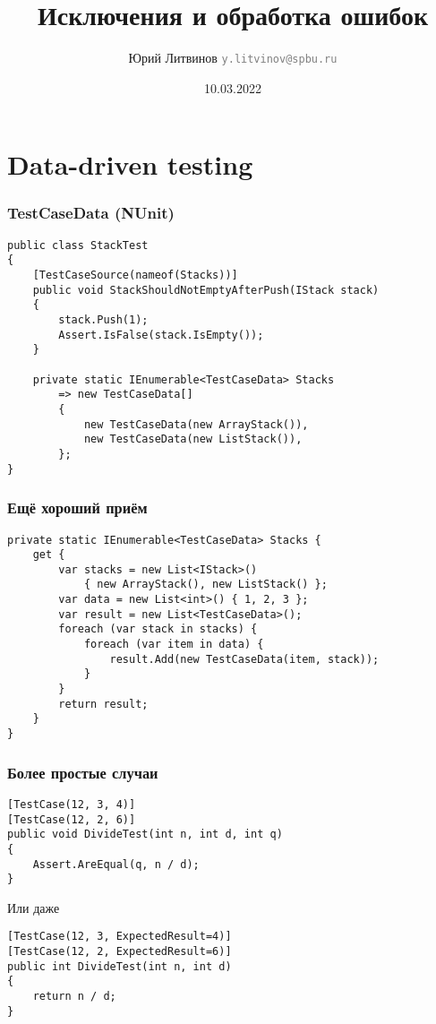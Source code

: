 \documentclass[xetex,mathserif,serif]{beamer}
\title{Исключения и обработка ошибок}
\author[Юрий Литвинов]{Юрий Литвинов \newline \textcolor{gray}{\small\texttt{y.litvinov@spbu.ru}}}
\date{10.03.2022}
\begin{document}
    
    \frame{\titlepage}

    \section{Data-driven testing}

    \begin{frame}[fragile]
        \frametitle{TestCaseData (NUnit)}
        \begin{verbatim}
public class StackTest
{
    [TestCaseSource(nameof(Stacks))]
    public void StackShouldNotEmptyAfterPush(IStack stack)
    {
        stack.Push(1);
        Assert.IsFalse(stack.IsEmpty());
    }

    private static IEnumerable<TestCaseData> Stacks
        => new TestCaseData[]
        {
            new TestCaseData(new ArrayStack()),
            new TestCaseData(new ListStack()),
        };
}
        \end{verbatim}
    \end{frame}

    \begin{frame}[fragile]
        \frametitle{Ещё хороший приём}
        \begin{verbatim}
private static IEnumerable<TestCaseData> Stacks { 
    get {
        var stacks = new List<IStack>() 
            { new ArrayStack(), new ListStack() };
        var data = new List<int>() { 1, 2, 3 };
        var result = new List<TestCaseData>();
        foreach (var stack in stacks) {
            foreach (var item in data) {
                result.Add(new TestCaseData(item, stack));
            }
        }
        return result;
    }
}
        \end{verbatim}
    \end{frame}

    \begin{frame}[fragile]
        \frametitle{Более простые случаи}
        \begin{verbatim}
[TestCase(12, 3, 4)]
[TestCase(12, 2, 6)]
public void DivideTest(int n, int d, int q)
{
    Assert.AreEqual(q, n / d);
}
        \end{verbatim}
        \vspace{3mm}
        Или даже
        \begin{verbatim}
[TestCase(12, 3, ExpectedResult=4)]
[TestCase(12, 2, ExpectedResult=6)]
public int DivideTest(int n, int d)
{
    return n / d;
}
        \end{verbatim}
    \end{frame}
\end{document}

